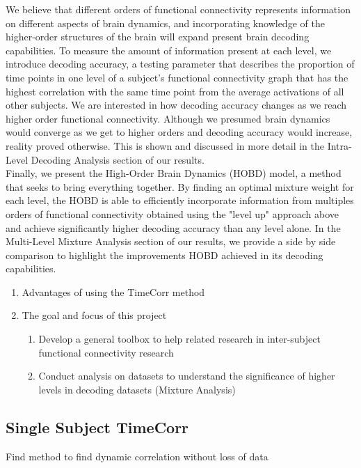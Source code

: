 \documentclass[12pt]{article}
\begin{document}
We believe that different orders of functional connectivity represents information on different aspects of brain dynamics, and incorporating knowledge of the higher-order structures of the brain will expand present brain decoding capabilities. To measure the amount of information present at each level, we introduce decoding accuracy, a testing parameter that describes the proportion of time points in one level of a subject's functional connectivity graph that has the highest correlation with the same time point from the average activations of all other subjects. We are interested in how decoding accuracy changes as we reach higher order functional connectivity. Although we presumed brain dynamics would converge as we get to higher orders and decoding accuracy would increase, reality proved otherwise. This is shown and discussed in more detail in the Intra-Level Decoding Analysis section of our results.\\

Finally, we present the High-Order Brain Dynamics (HOBD) model, a method that seeks to bring everything together. By finding an optimal mixture weight for each level, the HOBD is able to efficiently incorporate information from multiples orders of functional connectivity obtained using the "level up" approach above and achieve significantly higher decoding accuracy than any level alone. In the Multi-Level Mixture Analysis section of our results, we provide a side by side comparison to highlight the improvements HOBD achieved in its decoding capabilities.\\



\begin{enumerate}
\item Advantages of using the TimeCorr method
\item The goal and focus of this project
\begin{enumerate}
\item Develop a general toolbox to help related research in inter-subject functional connectivity research
\item Conduct analysis on datasets to understand the significance of higher levels in decoding datasets (Mixture Analysis)
\end{enumerate}
\end{enumerate}


\subsection{Single Subject TimeCorr}
Find method to find dynamic correlation without loss of data
\end{document}
